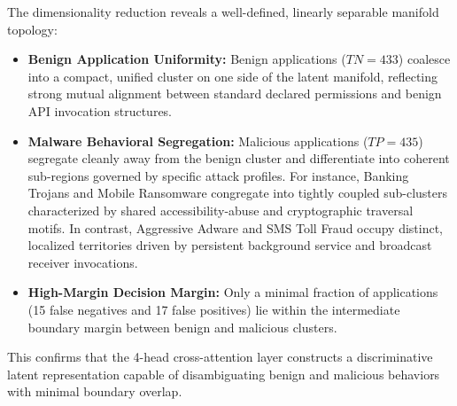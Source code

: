 \documentclass[12pt,a4paper,oneside]{report}
\begin{document}
The dimensionality reduction reveals a well-defined, linearly separable manifold topology:
\begin{itemize}
    \item \textbf{Benign Application Uniformity:} Benign applications ($TN = 433$) coalesce into a compact, unified cluster on one side of the latent manifold, reflecting strong mutual alignment between standard declared permissions and benign API invocation structures.
    \item \textbf{Malware Behavioral Segregation:} Malicious applications ($TP = 435$) segregate cleanly away from the benign cluster and differentiate into coherent sub-regions governed by specific attack profiles. For instance, Banking Trojans and Mobile Ransomware congregate into tightly coupled sub-clusters characterized by shared accessibility-abuse and cryptographic traversal motifs. In contrast, Aggressive Adware and SMS Toll Fraud occupy distinct, localized territories driven by persistent background service and broadcast receiver invocations.
    \item \textbf{High-Margin Decision Margin:} Only a minimal fraction of applications (15 false negatives and 17 false positives) lie within the intermediate boundary margin between benign and malicious clusters.
\end{itemize}
This confirms that the 4-head cross-attention layer constructs a discriminative latent representation capable of disambiguating benign and malicious behaviors with minimal boundary overlap.
\end{document}
